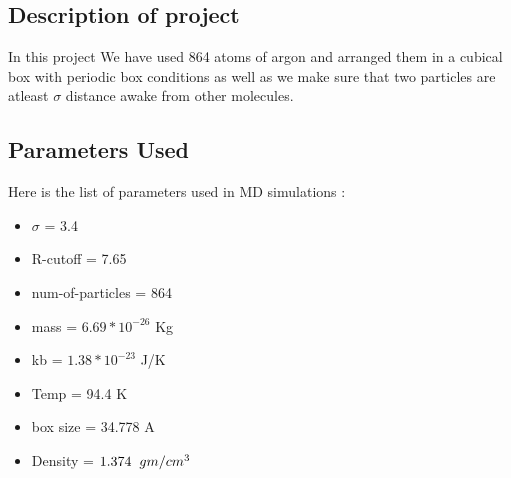 \documentclass[11pt]{article}
\begin{document}
\subsection{Description of project}
In this project We have used 864 atoms of argon and arranged them in a cubical box with periodic box conditions as well as we make sure that two particles are atleast $\sigma$ distance awake from other molecules.

\subsection{Parameters Used}
Here is the list of parameters used in MD simulations :
\begin{itemize}
\item $\sigma$ = 3.4
\item R-cutoff = 7.65
\item num-of-particles = 864
\item mass = $6.69 * {10^{-26}}$ Kg
\item kb = $1.38 * {10^{-23}}$ J/K
\item Temp = 94.4 K
\item box size = 34.778 A
\item Density = $1.374 \hspace{.2cm} gm/cm^3$
\end{itemize}
\end{document}
